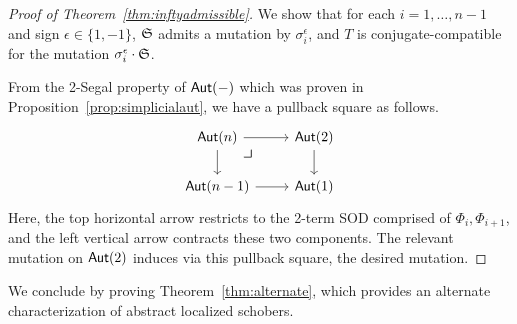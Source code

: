 \begin{proof}[Proof of Theorem~\ref{thm:inftyadmissible}]
    We show that for each $i=1,\dots,n-1$ and sign $\epsilon\in\{1,-1\}$, $\mathfrak{S}$ admits a mutation by $\sigma_i^{\epsilon}$, and $T$ is conjugate-compatible for the mutation $\sigma_i^{\epsilon}\cdot\mathfrak{S}$.

    From the 2-Segal property of $\mathsf{Aut}(-)$ which was proven in Proposition~\ref{prop:simplicialaut}, we have a pullback square as follows.
    \[\begin{tikzcd}[ampersand replacement=\&]
        {\sfAut(n)}\pullback \& {\sfAut(2)} \\
        {\sfAut(n-1)} \& {\sfAut(1)}
        \arrow[from=1-1, to=1-2]
        \arrow[from=1-1, to=2-1]
        \arrow[from=1-2, to=2-2]
        \arrow[from=2-1, to=2-2]
    \end{tikzcd}\]
    Here, the top horizontal arrow restricts to the 2-term SOD comprised of $\Phi_i,\Phi_{i+1}$, and the left vertical arrow contracts these two components. The relevant mutation on $\mathsf{Aut}(2)$ induces via this pullback square, the desired mutation.
\end{proof}

We conclude by proving Theorem~\ref{thm:alternate}, which provides an alternate characterization of abstract localized schobers.

